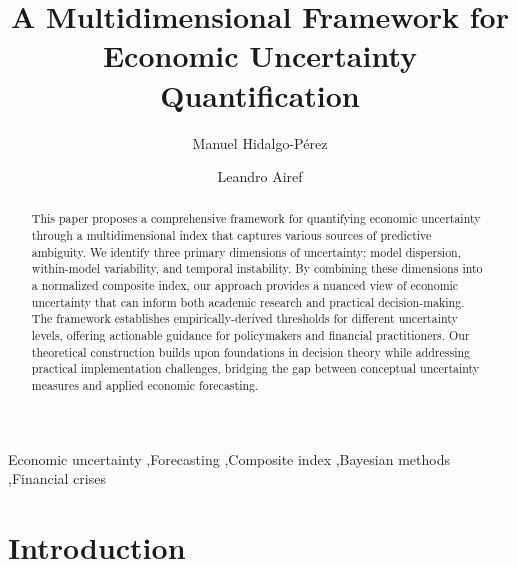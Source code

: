 \documentclass[5p,authoryear]{elsarticle}
\begin{document}
\begin{frontmatter}


\title{A Multidimensional Framework for Economic Uncertainty Quantification}    

\author[1]{Manuel Hidalgo-Pérez%
 }

\author[2]{Leandro Airef}





\begin{abstract}
This paper proposes a comprehensive framework for quantifying economic uncertainty through a multidimensional index that captures various sources of predictive ambiguity. We identify three primary dimensions of uncertainty: model dispersion, within-model variability, and temporal instability. By combining these dimensions into a normalized composite index, our approach provides a nuanced view of economic uncertainty that can inform both academic research and practical decision-making. The framework establishes empirically-derived thresholds for different uncertainty levels, offering actionable guidance for policymakers and financial practitioners. Our theoretical construction builds upon foundations in decision theory while addressing practical implementation challenges, bridging the gap between conceptual uncertainty measures and applied economic forecasting.
\end{abstract}

\begin{keyword}
Economic uncertainty \sep Forecasting \sep Composite index \sep Bayesian methods \sep Financial crises
\end{keyword}

\end{frontmatter}

\section{Introduction}
\end{document}
